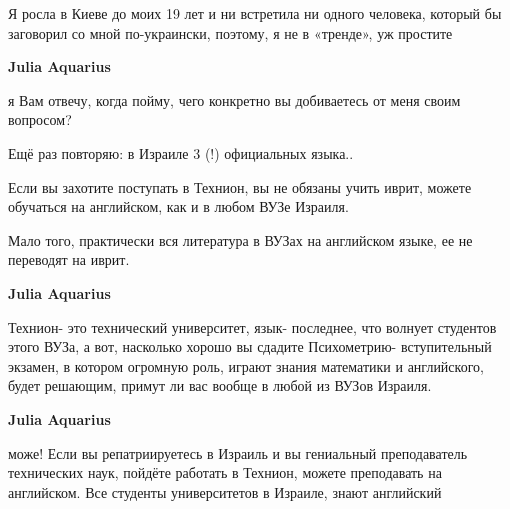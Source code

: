 \begin{itemize}
\begin{itemize}
Я росла в Киеве до моих 19 лет и ни встретила ни одного человека, который бы
заговорил со мной по-украински, поэтому, я не в «тренде», уж простите

 
\textbf{Julia Aquarius} 

я Вам отвечу, когда пойму, чего конкретно вы добиваетесь от меня своим
вопросом?

Ещё раз повторяю: в Израиле 3 (!) официальных языка..

Если вы захотите поступать в Технион, вы не обязаны учить иврит, можете
обучаться на английском, как и в любом ВУЗе Израиля.

Мало того, практически вся литература в ВУЗах на английском языке, ее не
переводят на иврит.


 
\textbf{Julia Aquarius} 

Технион- это технический университет, язык- последнее, что волнует студентов
этого ВУЗа, а вот, насколько хорошо вы сдадите Психометрию- вступительный
экзамен, в котором огромную роль, играют знания математики и английского, будет
решающим, примут ли вас вообще в любой из ВУЗов Израиля.

 
\textbf{Julia Aquarius} 

може! Если вы репатриируетесь в Израиль и вы гениальный преподаватель
технических наук, пойдёте работать в Технион, можете преподавать на английском.
Все студенты университетов в Израиле, знают английский



 

\end{itemize}
\end{itemize}

